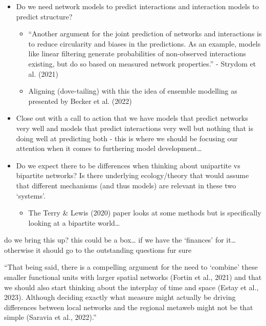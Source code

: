 \documentclass[
]{article}
\providecommand{\tightlist}{%
  \setlength{\itemsep}{0pt}\setlength{\parskip}{0pt}}\usepackage{longtable,booktabs,array}
\begin{document}
\begin{itemize}
\item
  Do we need network models to predict interactions and interaction
  models to predict structure?

  \begin{itemize}
  \item
    ``Another argument for the joint prediction of networks and
    interactions is to reduce circularity and biases in the predictions.
    As an example, models like linear filtering generate probabilities
    of non-observed interactions existing, but do so based on measured
    network properties.'' - Strydom et al. (2021)
  \item
    Aligning (dove-tailing) with this the idea of ensemble modelling as
    presented by Becker et al. (2022)
  \end{itemize}
\item
  Close out with a call to action that we have models that predict
  networks very well and models that predict interactions very well but
  nothing that is doing well at predicting both - this is where we
  should be focusing our attention when it comes to furthering model
  development\ldots{}
\item
  Do we expect there to be differences when thinking about unipartite vs
  bipartite networks? Is there underlying ecology/theory that would
  assume that different mechanisms (and thus models) are relevant in
  these two `systems'.

  \begin{itemize}
  \tightlist
  \item
    The Terry \& Lewis (2020) paper looks at some methods but is
    specifically looking at a bipartite world\ldots{}
  \end{itemize}
\end{itemize}

do we bring this up? this could be a box\ldots{} if we have the
`finances' for it\ldots{} otherwise it should go to the outstanding
questions fur sure

``That being said, there is a compelling argument for the need to
`combine' these smaller functional units with larger spatial networks
(Fortin et al., 2021) and that we should also start thinking about the
interplay of time and space (Estay et al., 2023). Although deciding
exactly what measure might actually be driving differences between local
networks and the regional metaweb might not be that simple (Saravia et
al., 2022).''
\end{document}
